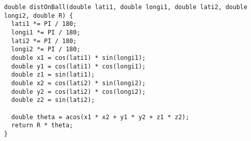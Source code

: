 \begin{lstlisting}
double distOnBall(double lati1, double longi1, double lati2, double longi2, double R) {
  lati1 *= PI / 180;
  longi1 *= PI / 180;
  lati2 *= PI / 180;
  longi2 *= PI / 180;
  double x1 = cos(lati1) * sin(longi1);
  double y1 = cos(lati1) * cos(longi1);
  double z1 = sin(lati1);
  double x2 = cos(lati2) * sin(longi2);
  double y2 = cos(lati2) * cos(longi2);
  double z2 = sin(lati2);

  double theta = acos(x1 * x2 + y1 * y2 + z1 * z2);
  return R * theta;
}

\end{lstlisting}